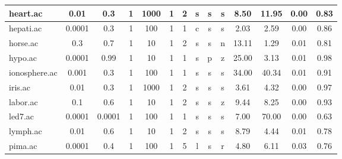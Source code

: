 \begin{table}[htbp]
\begin{tabular}{|l|c|c|c|c|c|c|c|c|c||c|c|c|c|}
		\hline
		heart.ac       & 0.01     & 0.3         & 1              & 1000                & 1             & 2             & s      & s        & s        & 8.50           & 11.95          & 0.00           & 0.83           \\
		\hline
		hepati.ac      & 0.0001   & 0.3         & 1              & 100                 & 1             & 1             & c      & s        & s        & 2.03           & 2.59           & 0.00           & 0.86           \\
		\hline
		horse.ac       & 0.3      & 0.7         & 1              & 10                  & 1             & 2             & s      & s        & n        & 13.11          & 1.29           & 0.01           & 0.81           \\
		\hline
		hypo.ac        & 0.0001   & 0.99        & 1              & 10                  & 1             & 1             & s      & p        & z        & 25.00          & 3.13           & 0.01           & 0.98           \\
		\hline
		ionosphere.ac  & 0.001    & 0.3         & 1              & 100                 & 1             & 1             & s      & s        & s        & 34.00          & 40.34          & 0.01           & 0.91           \\
		\hline
		iris.ac        & 0.01     & 0.3         & 1              & 1000                & 1             & 2             & s      & s        & s        & 3.61           & 4.32           & 0.00           & 0.97           \\
		\hline
		labor.ac       & 0.1      & 0.6         & 1              & 10                  & 1             & 2             & s      & s        & z        & 9.44           & 8.25           & 0.00           & 0.93           \\
		\hline
		led7.ac        & 0.0001   & 0.0001      & 1              & 100                 & 1             & 1             & s      & s        & s        & 7.00           & 70.00          & 0.00           & 0.63           \\
		\hline
		lymph.ac       & 0.01     & 0.6         & 1              & 10                  & 1             & 2             & s      & s        & s        & 8.79           & 4.44           & 0.01           & 0.78           \\
		\hline
		pima.ac        & 0.0001   & 0.4         & 1              & 100                 & 1             & 5             & l      & s        & r        & 4.80           & 6.11           & 0.03           & 0.76           \\

\end{tabular}
\end{table}

